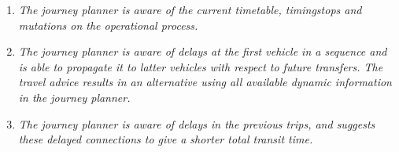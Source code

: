 \documentclass[a4paper,11pt]{article}
\begin{document}
\begin{enumerate}
\begin{enumerate}

\item \textit{The journey planner is aware of the current timetable, timingstops and mutations on the operational process.}


\item \textit{The journey planner is aware of delays at the first vehicle in a sequence and is able to propagate it to latter vehicles with respect to future transfers. The travel advice results in an alternative using all available dynamic information in the journey planner.}


\item \textit{The journey planner is aware of delays in the previous trips, and suggests these delayed connections to give a shorter total transit time.}


\end{enumerate}


\end{enumerate}










\listoftodos
\end{document}
